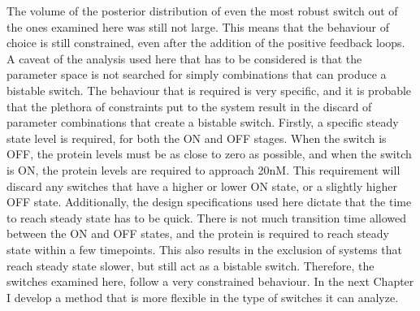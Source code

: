 The volume of the posterior distribution of even the most robust switch out of the ones examined here was still not large. This means that the behaviour of choice is still constrained, even after the addition of the positive feedback loops. A caveat of the analysis used here that has to be considered is that the parameter space is not searched for simply combinations that can produce a bistable switch. The behaviour that is required is very specific, and it is probable that the plethora of constraints put to the system result in the discard of parameter combinations that create a bistable switch. Firstly, a specific steady state level is required, for both the ON and OFF stages. When the switch is OFF, the protein levels must be as close to zero as possible, and when the switch is ON, the protein levels are required to approach 20nM. This requirement will discard any switches that have a higher or lower ON state, or a slightly higher OFF state. Additionally, the design specifications used here dictate that the time to reach steady state has to be quick. There is not much transition time allowed between the ON and OFF states, and the protein is required to reach steady state within a few timepoints. This also results in the exclusion of systems that reach steady state slower, but still act as a bistable switch. Therefore, the switches examined here, follow a very constrained behaviour. In the next Chapter I develop a method that is more flexible in the type of switches it can analyze.     






	
\clearpage
